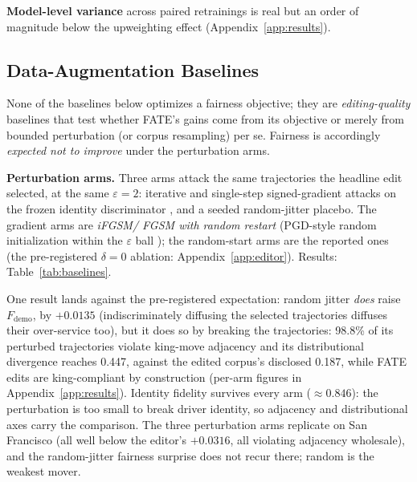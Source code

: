 \textbf{Model-level variance} across paired retrainings is real but an order
of magnitude below the upweighting effect (Appendix~\ref{app:results}).


\subsection{Data-Augmentation Baselines}\label{sec:exp-baselines}
None of the baselines below optimizes a fairness objective; they are
\emph{editing-quality} baselines that test whether FATE's gains come from
its objective or merely from bounded perturbation (or corpus resampling)
per se. Fairness is accordingly \emph{expected not to improve} under the
perturbation arms.

\textbf{Perturbation arms.} Three arms attack the same trajectories the
headline edit selected, at the same $\varepsilon = 2$: iterative and
single-step signed-gradient attacks on the frozen identity discriminator
\cite{hu2023stifgsm}, and
a seeded random-jitter placebo. The gradient arms are \emph{iFGSM\slash
FGSM with random restart} \cite{kurakin2017ifgsm,goodfellow2015fgsm}
(PGD-style random initialization within the
$\varepsilon$ ball \cite{madry2018pgd}); the random-start arms are the
reported ones (the pre-registered $\delta = 0$ ablation:
Appendix~\ref{app:editor}). Results: Table~\ref{tab:baselines}.

One result lands against the pre-registered expectation: random jitter
\emph{does} raise $F_{\mathrm{demo}}$, by $+0.0135$ (indiscriminately
diffusing the selected trajectories diffuses their over-service too), but it
does so by breaking the trajectories: 98.8\% of its perturbed trajectories
violate king-move adjacency and its distributional divergence reaches 0.447,
against the edited corpus's disclosed 0.187, while FATE edits are
king-compliant by construction (per-arm figures in
Appendix~\ref{app:results}). Identity fidelity survives every arm
($\approx 0.846$): the perturbation is too small to break driver identity, so
adjacency and distributional axes carry the comparison. The three perturbation arms replicate on San
Francisco (all well below the editor's $+0.0316$, all violating adjacency
wholesale), and the random-jitter fairness surprise does not recur there;
random is the weakest mover.

